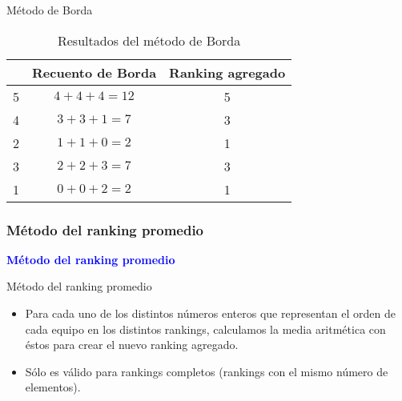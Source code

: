 \documentclass[10pt]{beamer}
\begin{document}
	\begin{frame}{Método de Borda}
		\begin{ejemplo}[continuación]
			
			\begin{table}[h]
				\centering
				\caption{Resultados del método de Borda}
				\label{tbl:borda_resultados}

				\begin{tabular}{@{}ccc@{}}
					\cmidrule(l){2-3}
					& Recuento de Borda & Ranking agregado \\ \midrule
					5 & $4 + 4 + 4 = 12$       & 5       \\
					4 & $3 + 3 + 1 =  7$       & 3       \\
					2 & $1 + 1 + 0 =  2$       & 1       \\
					3 & $2 + 2 + 3 =  7$       & 3       \\
					1 & $0 + 0 + 2 =  2$       & 1       \\ \bottomrule
				\end{tabular}

			\end{table}
			
		\end{ejemplo}
	\end{frame}
	
	\subsubsection{Método del ranking promedio}
	
	\begin{frame}
		\begin{center}
			\Huge\textbf{\textsf{\textcolor{blue}{Método del ranking promedio}}}
		\end{center}
	\end{frame}
	
	\begin{frame}{Método del ranking promedio}
		\begin{itemize}
			\item Para cada uno de los distintos números enteros que representan el orden de cada equipo en los distintos rankings, calculamos la media aritmética con éstos para crear el nuevo ranking agregado.
			
			\item Sólo es válido para rankings completos (rankings con el mismo número de elementos).
		\end{itemize}
	\end{frame}
	
\end{document}
